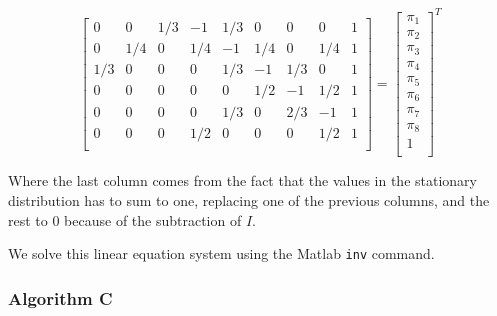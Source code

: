 \begin{equation*}
\begin{bmatrix}
          0 &         0  &  1/3       &  -1   & 1/3       &  0       &  0       &  0  &  1 \\
          0 &    1/4       &  0  &  1/4   &      -1  &  1/4       &  0  &  1/4  &       1 \\
     1/3 &         0       &  0       &  0  &  1/3   &      -1  &  1/3       &  0  &       1 \\
          0 &         0  &       0       &  0       &  0  &  1/2       &  -1  &  1/2  &       1 \\
          0 &         0       &  0       &  0   & 1/3       &  0  &  2/3       &  -1  &  1 \\
          0 &         0     &    0   & 1/2       &  0        & 0       &  0  &  1/2  &       1 \\ 
\end{bmatrix}
= 
\begin{bmatrix}
  \pi_1 \\  \pi_2 \\  \pi_3 \\  \pi_4 \\  \pi_5 \\  \pi_6 \\  \pi_7 \\  \pi_8 \\  1\\
\end{bmatrix}^T
\end{equation*}

Where the last column comes from the fact that the values in the stationary distribution has to sum to one, replacing one of the previous columns, and the rest to 0 because of the subtraction of $I$.

We solve this linear equation system using the Matlab \texttt{inv} command.

\subsubsection{Algorithm C}
\label{sec:alg1C}

